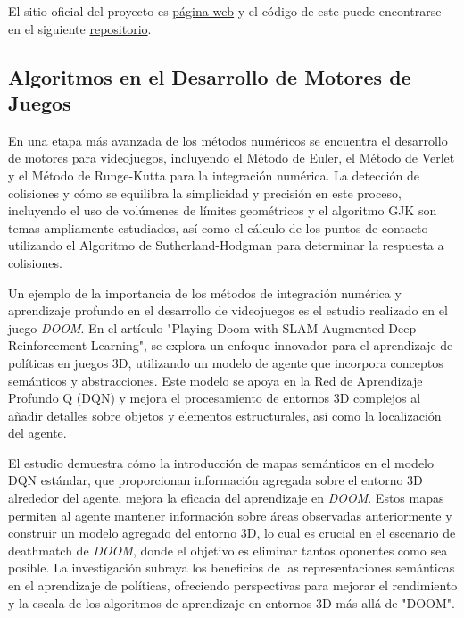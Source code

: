 \documentclass[a4paper]{article}
\begin{document}
    El sitio oficial del proyecto es \href{https://www.opengeosys.org/#:~:text=OpenGeoSys%20,the%20fields%20of%20regionals}{página web} y el código de este puede encontrarse en el siguiente \href{https://gitlab.opengeosys.org/ogs/ogs}{repositorio}.
    
    \subsection{Algoritmos en el Desarrollo de Motores de Juegos}
    En una etapa más avanzada de los métodos numéricos se encuentra el desarrollo de motores para videojuegos, incluyendo el Método de Euler, el Método de Verlet y el Método de Runge-Kutta para la integración numérica. La detección de colisiones y cómo se equilibra la simplicidad y precisión en este proceso, incluyendo el uso de volúmenes de límites geométricos y el algoritmo GJK son temas ampliamente estudiados, así como el cálculo de los puntos de contacto utilizando el Algoritmo de Sutherland-Hodgman para determinar la respuesta a colisiones.\cite{serranoalgos}
    
    Un ejemplo de la importancia de los métodos de integración numérica y aprendizaje profundo en el desarrollo de videojuegos es el estudio realizado en el juego \textit{DOOM}. En el artículo "Playing Doom with SLAM-Augmented Deep Reinforcement Learning", se explora un enfoque innovador para el aprendizaje de políticas en juegos 3D, utilizando un modelo de agente que incorpora conceptos semánticos y abstracciones. Este modelo se apoya en la Red de Aprendizaje Profundo Q (DQN) y mejora el procesamiento de entornos 3D complejos al añadir detalles sobre objetos y elementos estructurales, así como la localización del agente. 

    El estudio demuestra cómo la introducción de mapas semánticos en el modelo DQN estándar, que proporcionan información agregada sobre el entorno 3D alrededor del agente, mejora la eficacia del aprendizaje en \textit{DOOM}. Estos mapas permiten al agente mantener información sobre áreas observadas anteriormente y construir un modelo agregado del entorno 3D, lo cual es crucial en el escenario de deathmatch de \textit{DOOM}, donde el objetivo es eliminar tantos oponentes como sea posible. La investigación subraya los beneficios de las representaciones semánticas en el aprendizaje de políticas, ofreciendo perspectivas para mejorar el rendimiento y la escala de los algoritmos de aprendizaje en entornos 3D más allá de "DOOM".\cite{doommethods}
     
\end{document}
